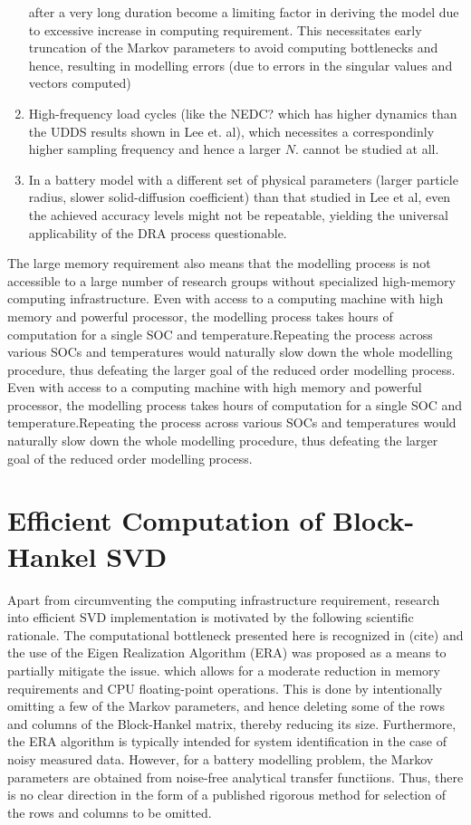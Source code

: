 \begin{enumerate}
after a very long duration become a limiting factor in deriving the
model due to excessive increase in computing requirement. This necessitates
early truncation of the Markov parameters to avoid computing bottlenecks
and hence, resulting in modelling errors (due to errors in the singular
values and vectors computed)
\item High-frequency load cycles (like the NEDC? which has higher dynamics
than the UDDS results shown in Lee et. al), which necessites a correspondinly
higher sampling frequency and hence a larger $N$. cannot be studied
at all.
\item In a battery model with a different set of physical parameters (larger
particle radius, slower solid-diffusion coefficient) than that studied
in Lee et al, even the achieved accuracy levels might not be repeatable,
yielding the universal applicability of the DRA process questionable.
\end{enumerate}
The large memory requirement also means that the modelling process
is not accessible to a large number of research groups without specialized
high-memory computing infrastructure. Even with access to a computing
machine with high memory and powerful processor, the modelling process
takes hours of computation for a single SOC and temperature.Repeating
the process across various SOCs and temperatures would naturally slow
down the whole modelling procedure, thus defeating the larger goal
of the reduced order modelling process.
Even with access to a computing machine with high memory and powerful
processor, the modelling process takes hours of computation for a
single SOC and temperature.Repeating the process across various SOCs
and temperatures would naturally slow down the whole modelling procedure,
thus defeating the larger goal of the reduced order modelling process.

\section{Efficient Computation of Block-Hankel SVD}

Apart from circumventing the computing infrastructure requirement,
research into efficient SVD implementation is motivated by the following
scientific rationale.
The computational bottleneck presented here is recognized in (cite)
and the use of the Eigen Realization Algorithm (ERA) was proposed
as a means to partially mitigate the issue. which allows for a moderate
reduction in memory requirements and CPU floating-point operations.
This is done by intentionally omitting a few of the Markov parameters,
and hence deleting some of the rows and columns of the Block-Hankel
matrix, thereby reducing its size. Furthermore, the ERA algorithm
is typically intended for system identification in the case of noisy
measured data. However, for a battery modelling problem, the Markov
parameters are obtained from noise-free analytical transfer functiions.
Thus, there is no clear direction in the form of a published rigorous
method for selection of the rows and columns to be omitted.

